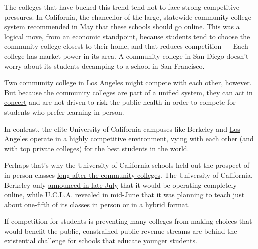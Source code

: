 The colleges that have bucked this trend tend not to face strong
competitive pressures. In California, the chancellor of the large,
statewide community college system recommended in May that these schools
should
\href{https://www.cbs8.com/article/news/local/california/california-community-college-chancellor-endorses-going-online-only-this-fall/509-bab87578-c4be-4f25-bce7-58bdecf57c90}{go
online}. This was a logical move, from an economic standpoint, because
students tend to choose the community college closest to their home, and
that reduces competition --- Each college has market power in its area.
A community college in San Diego doesn't worry about its students
decamping to a school in San Francisco.

Two community college in Los Angeles might compete with each other,
however. But because the community colleges are part of a unified
system,
\href{https://edsource.org/2020/some-california-colleges-decide-to-offer-all-fall-classes-online/630660}{they
can act in concert} and are not driven to risk the public health in
order to compete for students who prefer learning in person.

In contrast, the elite University of California campuses like Berkeley
and \href{https://www.ucla.edu/}{Los Angeles} operate in a highly
competitive environment, vying with each other (and with top private
colleges) for the best students in the world.

Perhaps that's why the University of California schools held out the
prospect of in-person classes
\href{https://www.sacbee.com/news/politics-government/capitol-alert/article244116777.html}{long
after the community colleges}. The University of California, Berkeley
only
\href{https://www.berkeleyside.com/2020/07/21/uc-berkeley-online-covid-19-fall-semester}{announced
in late July} that it would be operating completely online, while
U.C.L.A.
\href{https://newsroom.ucla.edu/releases/preparations-for-the-2020-21-academic-year}{revealed
in mid-June} that it was planning to teach just about one-fifth of its
classes in person or in a hybrid format.

If competition for students is preventing many colleges from making
choices that would benefit the public, constrained public revenue
streams are behind the existential challenge for schools that educate
younger students.

